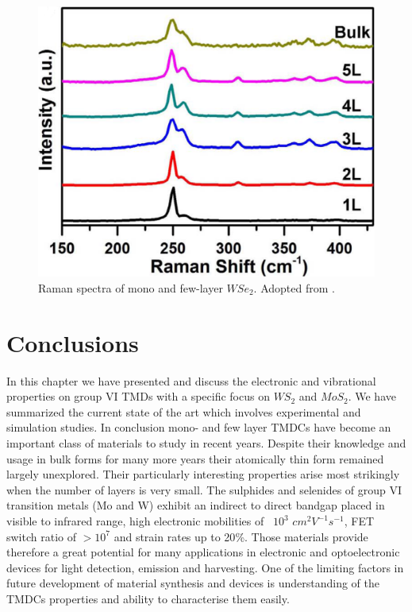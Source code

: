 \begin{figure}[h]
	\begin{center}
		\includegraphics[scale=0.2]{WSe2RamanSpectra.png}
		\caption{Raman spectra of mono and few-layer $WSe_2$. Adopted from \cite{Terrones2014}.}
		\label{fig:WSe2RamanSpectra}
	\end{center}
\end{figure}

\newpage
\section{Conclusions}

In this chapter we have presented and discuss the electronic and vibrational properties on group VI TMDs with a specific focus on $WS_2$ and $MoS_2$. We have summarized the current state of the art which involves experimental and simulation studies. In conclusion mono- and few layer TMDCs have become an important class of materials to study in recent years. Despite their knowledge and usage in bulk forms for many more years their atomically thin form remained largely unexplored. Their particularly interesting properties arise most strikingly when the number of layers is very small. The sulphides and selenides of group VI transition metals  (Mo and W) exhibit an indirect to direct bandgap placed in visible to infrared range, high electronic mobilities of ~$10^3$ $cm^2 V^{-1} s^{-1}$, FET switch ratio of $>10^7$ and strain rates up to 20{\%}. Those materials provide therefore a great potential for many applications in electronic and optoelectronic devices for light detection, emission and harvesting. One of the limiting factors in future development of material synthesis and devices is understanding of the TMDCs properties and ability to characterise them easily.